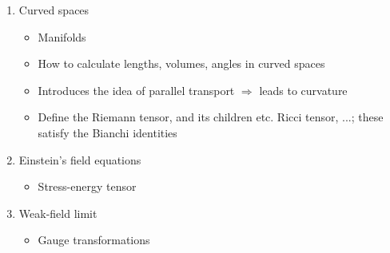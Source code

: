 \documentclass[a4paper]{article} %
\begin{document}
\begin{enumerate}
\begin{itemize}
\end{itemize}
\item Curved spaces
\begin{itemize}
\item Manifolds 
\item How to calculate lengths, volumes, angles in curved spaces
\item Introduces the idea of parallel transport $\Rightarrow$ leads to curvature
\item Define the Riemann tensor, and its children etc. Ricci tensor, ...; these satisfy the Bianchi identities
\end{itemize}
\item Einstein's field equations
\begin{itemize}
\item Stress-energy tensor
\end{itemize}
\item Weak-field limit
\begin{itemize}
\item Gauge transformations
\end{itemize}

\end{enumerate}
\end{document}
